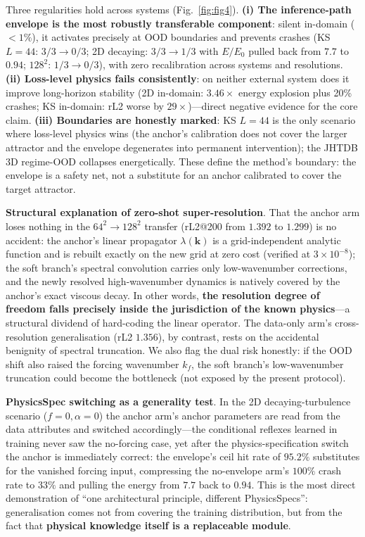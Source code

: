 \documentclass[11pt,a4paper]{article}
\begin{document}
Three regularities hold across systems (Fig.~\ref{fig:fig4}). \textbf{(i) The inference-path envelope is the most robustly transferable component}: silent in-domain ($<1\%$), it activates precisely at OOD boundaries and prevents crashes (KS $L{=}44$: $3/3{\to}0/3$; 2D decaying: $3/3{\to}1/3$ with $E/E_0$ pulled back from $7.7$ to $0.94$; $128^2$: $1/3{\to}0/3$), with zero recalibration across systems and resolutions. \textbf{(ii) Loss-level physics fails consistently}: on neither external system does it improve long-horizon stability (2D in-domain: $3.46\times$ energy explosion plus 20\% crashes; KS in-domain: rL2 worse by $29\times$)---direct negative evidence for the core claim. \textbf{(iii) Boundaries are honestly marked}: KS $L{=}44$ is the only scenario where loss-level physics wins (the anchor's calibration does not cover the larger attractor and the envelope degenerates into permanent intervention); the JHTDB 3D regime-OOD collapses energetically. These define the method's boundary: the envelope is a safety net, not a substitute for an anchor calibrated to cover the target attractor.

\textbf{Structural explanation of zero-shot super-resolution}. That the anchor arm loses nothing in the $64^2{\to}128^2$ transfer (rL2@200 from $1.392$ to $1.299$) is no accident: the anchor's linear propagator $\lambda(\bm{k})$ is a grid-independent analytic function and is rebuilt exactly on the new grid at zero cost (verified at $3\times10^{-8}$); the soft branch's spectral convolution carries only low-wavenumber corrections, and the newly resolved high-wavenumber dynamics is natively covered by the anchor's exact viscous decay. In other words, \textbf{the resolution degree of freedom falls precisely inside the jurisdiction of the known physics}---a structural dividend of hard-coding the linear operator. The data-only arm's cross-resolution generalisation (rL2 $1.356$), by contrast, rests on the accidental benignity of spectral truncation. We also flag the dual risk honestly: if the OOD shift also raised the forcing wavenumber $k_f$, the soft branch's low-wavenumber truncation could become the bottleneck (not exposed by the present protocol).

\textbf{PhysicsSpec switching as a generality test}. In the 2D decaying-turbulence scenario ($f{=}0,\alpha{=}0$) the anchor arm's anchor parameters are read from the data attributes and switched accordingly---the conditional reflexes learned in training never saw the no-forcing case, yet after the physics-specification switch the anchor is immediately correct: the envelope's ceil hit rate of $95.2\%$ substitutes for the vanished forcing input, compressing the no-envelope arm's $100\%$ crash rate to $33\%$ and pulling the energy from $7.7$ back to $0.94$. This is the most direct demonstration of ``one architectural principle, different PhysicsSpecs'': generalisation comes not from covering the training distribution, but from the fact that \textbf{physical knowledge itself is a replaceable module}.
\end{document}
